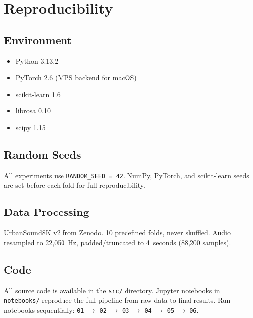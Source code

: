 \documentclass[conference]{IEEEtran}
\begin{document}
\appendix

\section{Reproducibility}
\label{app:reproducibility}

\subsection{Environment}
\begin{itemize}
    \item Python 3.13.2
    \item PyTorch 2.6 (MPS backend for macOS)
    \item scikit-learn 1.6
    \item librosa 0.10
    \item scipy 1.15
\end{itemize}

\subsection{Random Seeds}
All experiments use \texttt{RANDOM\_SEED = 42}. NumPy, PyTorch, and scikit-learn seeds are set before each fold for full reproducibility.

\subsection{Data Processing}
UrbanSound8K v2 from Zenodo. 10 predefined folds, never shuffled. Audio resampled to 22,050~Hz, padded/truncated to 4~seconds (88,200 samples).

\subsection{Code}
All source code is available in the \texttt{src/} directory. Jupyter notebooks in \texttt{notebooks/} reproduce the full pipeline from raw data to final results. Run notebooks sequentially: \texttt{01} $\rightarrow$ \texttt{02} $\rightarrow$ \texttt{03} $\rightarrow$ \texttt{04} $\rightarrow$ \texttt{05} $\rightarrow$ \texttt{06}.
\end{document}
